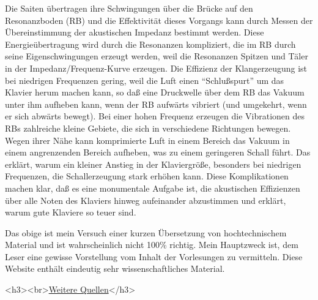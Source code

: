 Die Saiten übertragen ihre Schwingungen über die Brücke auf den Resonanzboden (RB) und die Effektivität dieses Vorgangs kann durch Messen der Übereinstimmung der akustischen Impedanz bestimmt werden.
Diese Energieübertragung wird durch die Resonanzen kompliziert, die im RB durch seine  Eigenschwingungen erzeugt werden, weil die Resonanzen Spitzen und Täler in der Impedanz/Frequenz-Kurve erzeugen.
Die Effizienz der Klangerzeugung ist bei niedrigen Frequenzen gering, weil die Luft einen \enquote{Schlußspurt} um das Klavier herum machen kann, so daß eine Druckwelle über dem RB das Vakuum unter ihm aufheben kann, wenn der RB aufwärts vibriert (und umgekehrt, wenn er sich abwärts bewegt).
Bei einer hohen Frequenz erzeugen die Vibrationen des RBs zahlreiche kleine Gebiete, die sich in verschiedene Richtungen bewegen.
Wegen ihrer Nähe kann komprimierte Luft in einem Bereich das Vakuum in einem angrenzenden Bereich aufheben, was zu einem geringeren Schall führt.
Das erklärt, warum ein kleiner Anstieg in der Klaviergröße, besonders bei niedrigen Frequenzen, die Schallerzeugung stark erhöhen kann.
Diese Komplikationen machen klar, daß es eine monumentale Aufgabe ist, die akustischen Effizienzen über alle Noten des Klaviers hinweg aufeinander abzustimmen und erklärt, warum gute Klaviere so teuer sind.

Das obige ist mein Versuch einer kurzen Übersetzung von hochtechnischem Material und ist wahrscheinlich nicht 100\% richtig.
Mein Hauptzweck ist, dem Leser eine gewisse Vorstellung vom Inhalt der Vorlesungen zu vermitteln.
Diese Website enthält eindeutig sehr wissenschaftliches Material.


<h3><br>\underline{Weitere Quellen}</h3>

